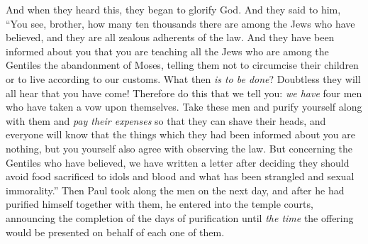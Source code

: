 \begin{biblechapter}
\verse And when they heard this, they began to glorify God. And they said to him, “You see, brother, how many ten thousands there are among the Jews who have believed, and they are all zealous adherents of the law.
\verse And they have been informed about you that you are teaching all the Jews who are among the Gentiles the abandonment of Moses, telling them not to circumcise their children or to live according to our customs.
\verse What then \textit{is to be done}? Doubtless they will all hear that you have come!
\verse Therefore do this that we tell you: \textit{we have} four men who have taken a vow upon themselves.
\verse Take these men and purify yourself along with them and \textit{pay their expenses} so that they can shave their heads, and everyone will know that the things which they had been informed about you are nothing, but you yourself also agree with observing the law.
\verse But concerning the Gentiles who have believed, we have written a letter after deciding they should avoid food sacrificed to idols and blood and what has been strangled and sexual immorality.”
\verse Then Paul took along the men on the next day, and after he had purified himself together with them, he entered into the temple courts, announcing the completion of the days of purification until \textit{the time} the offering would be presented on behalf of each one of them.

\end{biblechapter}
